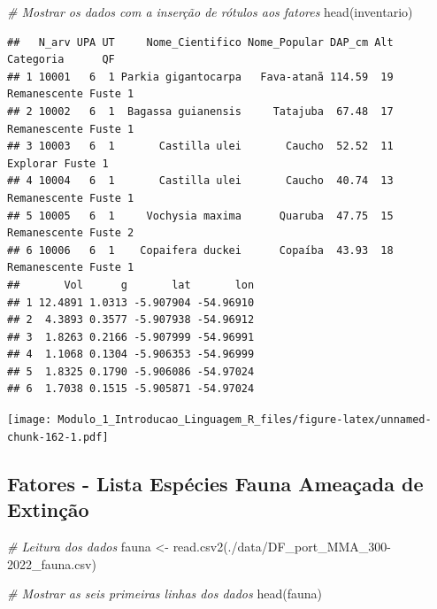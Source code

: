 \documentclass[
]{article}
\newenvironment{Shaded}{\begin{snugshade}}{\end{snugshade}}
\newcommand{\CommentTok}[1]{\textcolor[rgb]{0.56,0.35,0.01}{\textit{#1}}}
\newcommand{\FunctionTok}[1]{\textcolor[rgb]{0.00,0.00,0.00}{#1}}
\newcommand{\NormalTok}[1]{#1}
\newcommand{\OtherTok}[1]{\textcolor[rgb]{0.56,0.35,0.01}{#1}}
\newcommand{\SpecialCharTok}[1]{\textcolor[rgb]{0.00,0.00,0.00}{#1}}
\newcommand{\StringTok}[1]{\textcolor[rgb]{0.31,0.60,0.02}{#1}}
\begin{document}
\begin{Shaded}
\begin{Highlighting}[]
\CommentTok{\# Mostrar os dados com a inserção de rótulos aos fatores}
\FunctionTok{head}\NormalTok{(inventario)}
\end{Highlighting}
\end{Shaded}

\begin{verbatim}
##   N_arv UPA UT     Nome_Cientifico Nome_Popular DAP_cm Alt    Categoria      QF
## 1 10001   6  1 Parkia gigantocarpa   Fava-atanã 114.59  19 Remanescente Fuste 1
## 2 10002   6  1  Bagassa guianensis     Tatajuba  67.48  17 Remanescente Fuste 1
## 3 10003   6  1       Castilla ulei       Caucho  52.52  11     Explorar Fuste 1
## 4 10004   6  1       Castilla ulei       Caucho  40.74  13 Remanescente Fuste 1
## 5 10005   6  1     Vochysia maxima      Quaruba  47.75  15 Remanescente Fuste 2
## 6 10006   6  1    Copaifera duckei      Copaíba  43.93  18 Remanescente Fuste 1
##       Vol      g       lat       lon
## 1 12.4891 1.0313 -5.907904 -54.96910
## 2  4.3893 0.3577 -5.907938 -54.96912
## 3  1.8263 0.2166 -5.907999 -54.96991
## 4  1.1068 0.1304 -5.906353 -54.96999
## 5  1.8325 0.1790 -5.906086 -54.97024
## 6  1.7038 0.1515 -5.905871 -54.97024
\end{verbatim}

\begin{Shaded}
\end{Shaded}

\texttt{[image: Modulo\_1\_Introducao\_Linguagem\_R\_files/figure-latex/unnamed-chunk-162-1.pdf]}

\hypertarget{fatores---lista-espuxe9cies-fauna-ameauxe7ada-de-extinuxe7uxe3o}{%
\subsection{Fatores - Lista Espécies Fauna Ameaçada de
Extinção}\label{fatores---lista-espuxe9cies-fauna-ameauxe7ada-de-extinuxe7uxe3o}}

\begin{Shaded}
\begin{Highlighting}[]
\CommentTok{\# Leitura dos dados}
\NormalTok{fauna }\OtherTok{\textless{}{-}} \FunctionTok{read.csv2}\NormalTok{(}\StringTok{\textquotesingle{}./data/DF\_port\_MMA\_300{-}2022\_fauna.csv\textquotesingle{}}\NormalTok{)}

\CommentTok{\# Mostrar as seis primeiras linhas dos dados}
\FunctionTok{head}\NormalTok{(fauna)}
\end{Highlighting}
\end{Shaded}
\end{document}
